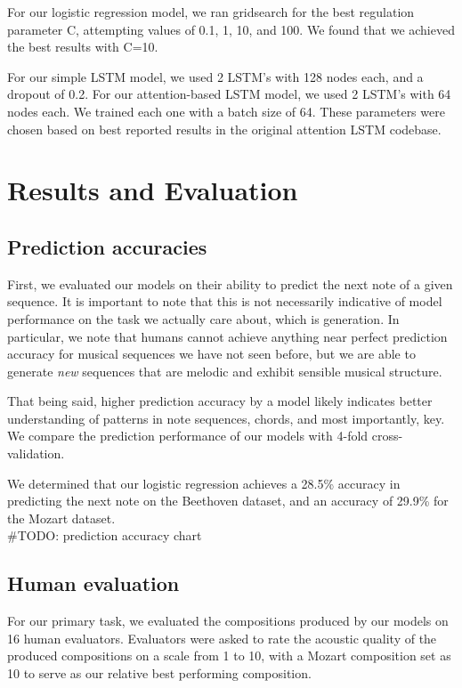\documentclass[twoside,twocolumn]{article}
\begin{document}
For our logistic regression model, we ran gridsearch for the best regulation parameter C, attempting values of 0.1, 1, 10, and 100. We found that we achieved the best results with C=10. 

For our simple LSTM model, we used 2 LSTM's with 128 nodes each, and a dropout of 0.2. For our attention-based LSTM model, we used 2 LSTM's with 64 nodes each. We trained each one with a batch size of 64. These parameters were chosen based on best reported results in the original attention LSTM codebase.



\section{Results and Evaluation}

\subsection{Prediction accuracies}
First, we evaluated our models on their ability to predict the next note of a given sequence. It is important to note that this is not necessarily indicative of model performance on the task we actually care about, which is generation. In particular, we note that humans cannot achieve anything near perfect prediction accuracy for musical sequences we have not seen before, but we are able to generate \textit{new} sequences that are melodic and exhibit sensible musical structure. 

That being said, higher prediction accuracy by a model likely indicates better understanding of patterns in note sequences, chords, and most importantly, key. We compare the prediction performance of our models with 4-fold cross-validation.

We determined that our logistic regression achieves a 28.5\% accuracy  in predicting the next note on the Beethoven dataset, and an accuracy of 29.9\% for the Mozart dataset. \\

\#TODO: prediction accuracy chart


\subsection{Human evaluation}
For our primary task, we evaluated the compositions produced by our models on 16 human
evaluators. Evaluators were asked to rate the acoustic quality of the produced
compositions on a scale from 1 to 10, with a Mozart composition set as 10 to
serve as our relative best performing composition.
\end{document}
